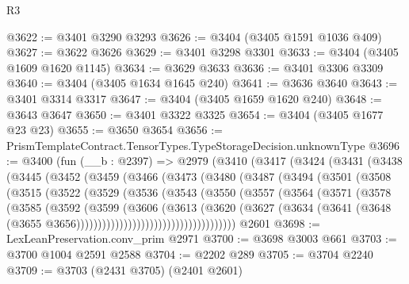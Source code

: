 \begin{lexlean}{R3}
\begin{coremodule}
@3622 := @3401 @3290 @3293
@3626 := @3404 (@3405 @1591 @1036 @409)
@3627 := @3622 @3626
@3629 := @3401 @3298 @3301
@3633 := @3404 (@3405 @1609 @1620 @1145)
@3634 := @3629 @3633
@3636 := @3401 @3306 @3309
@3640 := @3404 (@3405 @1634 @1645 @240)
@3641 := @3636 @3640
@3643 := @3401 @3314 @3317
@3647 := @3404 (@3405 @1659 @1620 @240)
@3648 := @3643 @3647
@3650 := @3401 @3322 @3325
@3654 := @3404 (@3405 @1677 @23 @23)
@3655 := @3650 @3654
@3656 := PrismTemplateContract.TensorTypes.TypeStorageDecision.unknownType
@3696 := @3400
    (fun (__b : @2397) =>
    @2979
      (@3410
        (@3417
          (@3424
            (@3431
              (@3438
                (@3445
                  (@3452
                    (@3459
                      (@3466
                        (@3473
                          (@3480
                            (@3487
                              (@3494
                                (@3501
                                  (@3508
                                    (@3515
                                      (@3522
                                        (@3529
                                          (@3536
                                            (@3543
                                              (@3550
                                                (@3557
                                                  (@3564
                                                    (@3571
                                                      (@3578
                                                        (@3585
                                                          (@3592
                                                            (@3599
                                                              (@3606
                                                                (@3613
                                                                  (@3620
                                                                    (@3627
                                                                      (@3634
                                                                        (@3641
                                                                          (@3648
                                                                            (@3655
                                                                              @3656)))))))))))))))))))))))))))))))))))))
    @2601
@3698 := LexLeanPreservation.conv_prim @2971
@3700 := @3698 @3003 @661
@3703 := @3700 @1004 @2591 @2588
@3704 := @2202 @289
@3705 := @3704 @2240
@3709 := @3703 (@2431 @3705) (@2401 @2601)

\end{coremodule}
\end{lexlean}
